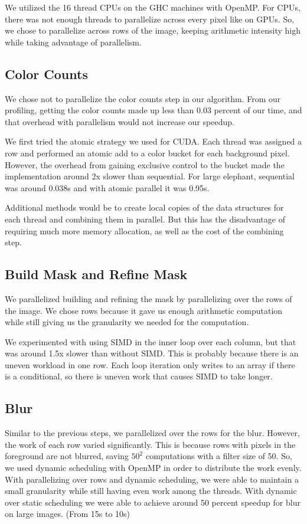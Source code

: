 \documentclass[12pt]{article}
\begin{document}
We utilized the 16 thread CPUs on the GHC machines with OpenMP. For CPUs, there
was not enough threads to parallelize across every pixel like on GPUs. So, we
chose to parallelize across rows of the image, keeping arithmetic intensity
high while taking advantage of parallelism.

\subsection{Color Counts}

We chose not to parallelize the color counts step in our algorithm. From our
profiling, getting the color counts made up less than 0.03 percent of our time,
and that overhead with parallelism would not increase our speedup.

We first tried the atomic strategy we used for CUDA. Each thread was assigned a
row and performed an atomic add to a color bucket for each background pixel.
However, the overhead from gaining exclusive control to the bucket made the
implementation around 2x slower than sequential. For large elephant, sequential
was around 0.038s and with atomic parallel it was 0.95s.

Additional methods would be to create local copies of the data structures for
each thread and combining them in parallel. But this has the disadvantage of
requiring much more memory allocation, as well as the cost of the combining
step.

\subsection{Build Mask and Refine Mask}

We parallelized building and refining the mask by parallelizing over the rows
of the image. We chose rows because it gave us enough arithmetic computation
while still giving us the granularity we needed for the computation.

We experimented with using SIMD in the inner loop over each column, but that
was around 1.5x slower than without SIMD. This is probably because there is an
uneven workload in one row. Each loop iteration only writes to an array if
there is a conditional, so there is uneven work that causes SIMD to take
longer.

\subsection{Blur}

Similar to the previous steps, we parallelized over the rows for the blur.
However, the work of each row varied significantly. This is because rows with
pixels in the foreground are not blurred, saving $50^2$ computations with a
filter size of 50. So, we used dynamic scheduling with OpenMP in order to
distribute the work evenly. With parallelizing over rows and dynamic
scheduling, we were able to maintain a small granularity while still having
even work among the threads. With dynamic over static scheduling we were able
to achieve around 50 percent speedup for blur on large images. (From 15s to
10s)
\end{document}
